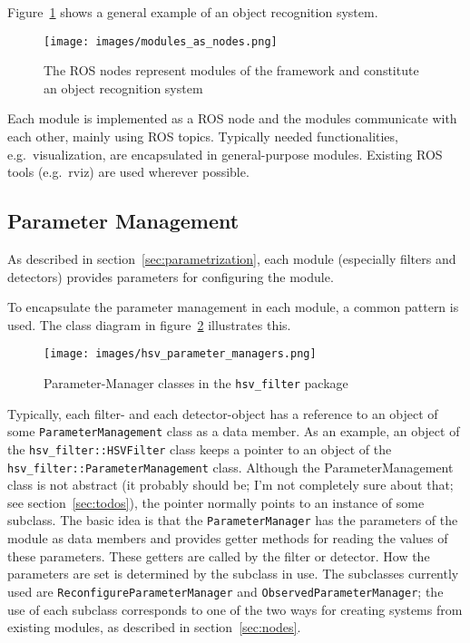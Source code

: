 \documentclass{article}
\newcommand{\code}[1]{\texttt{#1}}
\begin{document}
Figure~\ref{fig:modules_as_nodes} shows a general example of an object
recognition system.
\begin{figure}
	\centering
	\texttt{[image: images/modules\_as\_nodes.png]}
	\caption{The ROS nodes represent modules of the framework and constitute
	an object recognition system}
	\label{fig:modules_as_nodes}
\end{figure}
Each module is implemented as a ROS node and the modules communicate with each
other, mainly using ROS topics.
Typically needed functionalities, e.g.\ visualization, are encapsulated in
general-purpose modules. Existing ROS tools (e.g.\ rviz) are used
wherever possible.


\subsection{Parameter Management}
\label{sec:param_mgmt}

As described in section~\ref{sec:parametrization}, each module
(especially filters and detectors) provides parameters for
configuring the module.

To encapsulate the parameter management in each module, a common
pattern is used.
The class diagram in figure~\ref{fig:hsv_param_managers} illustrates this.
\begin{figure}
	\centering
	\texttt{[image: images/hsv\_parameter\_managers.png]}
	\caption{Parameter-Manager classes in the \code{hsv\_filter} package}
	\label{fig:hsv_param_managers}
\end{figure}
Typically, each filter- and each detector-object has a
reference to an object of some \code{ParameterManagement} class
as a data member.
As an example, an object of the \code{hsv\_filter::HSVFilter} class keeps a
pointer to an object of the \code{hsv\_filter::ParameterManagement} class.
Although the ParameterManagement class is not abstract
(it probably should be; I'm not completely sure about that; see
section~\ref{sec:todos}), the
pointer normally points to an instance of some subclass.
The basic idea is that the \code{ParameterManager} has the parameters
of the module as data members and provides getter methods for reading
the values of these parameters.
These getters are called by the filter or detector.
How the parameters are set is determined by the subclass in use.
The subclasses currently used are \code{ReconfigureParameterManager} and
\code{ObservedParameterManager}; the use of each subclass corresponds
to one of the two ways for creating systems from existing modules, as described
in section~\ref{sec:nodes}.
\end{document}
